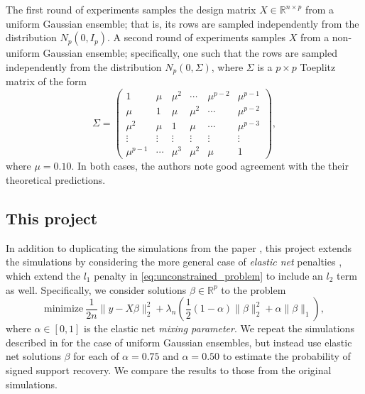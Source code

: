 \documentclass[letterpaper,12pt]{article}
\newcommand{\norm}[1]{\lVert#1\rVert}
\begin{document}
The first round of experiments samples the design matrix
$X \in \mathbb{R}^{n \times p}$ from a uniform Gaussian ensemble; that
is, its rows are sampled independently from the distribution
$N_p(0, I_p)$. A second round of experiments samples $X$ from a
non-uniform Gaussian ensemble; specifically, one such that the rows
are sampled independently from the distribution $N_p(0, \Sigma)$,
where $\Sigma$ is a $p \times p$ Toeplitz matrix of the form
\begin{equation} \label{eq:toeplitz_covariance}
  \Sigma =
  \begin{pmatrix}
    1 & \mu & \mu^2 & \cdots & \mu^{p-2} & \mu^{p-1} \\
    \mu & 1 & \mu & \mu^2 & \cdots & \mu^{p-2} \\
    \mu^2 & \mu & 1 & \mu & \cdots & \mu^{p-3} \\
    \vdots & \vdots & \vdots & \vdots & \vdots & \vdots \\
    \mu^{p-1} & \cdots & \mu^3 & \mu^2 & \mu & 1
  \end{pmatrix},
\end{equation}
where $\mu = 0.10$. In both cases, the authors note good agreement
with the their theoretical predictions.

\subsection*{This project}

In addition to duplicating the simulations from the paper
\cite{wainwright06}, this project extends the simulations by
considering the more general case of \textit{elastic net} penalties
\cite{zou_hastie05}, which extend the $l_1$ penalty in
\eqref{eq:unconstrained_problem} to include an $l_2$ term as
well. Specifically, we consider solutions $\beta \in \mathbb{R}^p$ to
the problem
\begin{equation} \label{eq:elastic_net_problem}
  \text{minimize} \
    \frac{1}{2n} \norm{y - X\beta}_2^2
      + \lambda_n \left( \frac{1}{2} (1 - \alpha) \norm{\beta}_2^2
      + \alpha \norm{\beta}_1 \right ),
\end{equation}
where $\alpha \in [0, 1]$ is the elastic net \textit{mixing
  parameter}. We repeat the simulations described in
\cite{wainwright06} for the case of uniform Gaussian ensembles, but
instead use elastic net solutions $\beta$ for each of $\alpha = 0.75$
and $\alpha = 0.50$ to estimate the probability of signed support
recovery. We compare the results to those from the original
simulations.
\end{document}
